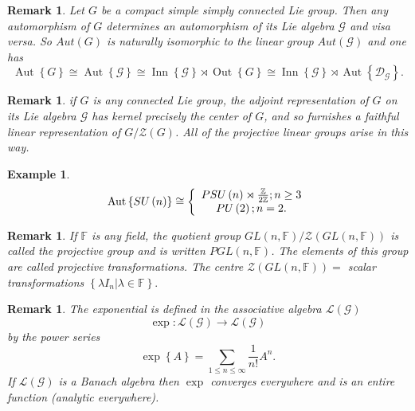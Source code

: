 \documentclass[aps,preprint]{revtex4}%
\newtheorem{example}[theorem]{Example}
\newtheorem{remark}[theorem]{Remark}
\begin{document}
\begin{remark}
Let $G$ be a \emph{compact simple simply connected Lie group}. Then any
automorphism of $G$ determines an automorphism of its Lie algebra
$\mathcal{G}$ and visa versa. So $Aut(G)$ is naturally isomorphic to the
linear group $Aut(\mathcal{G})$ and one has
\begin{equation}
\operatorname{Aut}\left\{  G\right\}  \cong\operatorname{Aut}\left\{
\mathcal{G}\right\}  \cong\operatorname*{Inn}\left\{  \mathcal{G}\right\}
\rtimes\operatorname*{Out}\left\{  G\right\}  \cong\operatorname*{Inn}\left\{
\mathcal{G}\right\}  \rtimes\operatorname{Aut}\left\{  \mathcal{D}%
_{\mathcal{G}}\right\}  .
\end{equation}

\end{remark}

\begin{remark}
if $G$ is any connected Lie group, the \emph{adjoint representation} of $G$ on
its Lie algebra $\mathcal{G}$ has kernel precisely the center of $G$, and so
furnishes a faithful linear representation of $G/\mathcal{Z}(G)$. \emph{All of
the projective linear groups} arise in this way.
\end{remark}

\begin{example}%
\begin{equation}
\operatorname{Aut}\left\{  SU\left(  n\right)  \right\}  \cong\left\{
\begin{array}
[c]{c}%
PSU\left(  n\right)  \rtimes\frac{\mathbb{Z}}{2\mathbb{Z}};n\geq3\\
PU\left(  2\right)  ;n=2.
\end{array}
\right.
\end{equation}

\end{example}

\begin{remark}
If $\mathbb{F}$ is any field, the quotient group $GL(n,\mathbb{F}%
)/\mathcal{Z}\left(  GL(n,\mathbb{F})\right)  $ is called the \emph{projective
group} and is written $PGL(n,\mathbb{F})$. The elements of this group are
called projective transformations. The centre $\mathcal{Z}\left(
GL(n,\mathbb{F})\right)  =$ scalar transformations $\left\{  \left.  \lambda
I_{n}\right\vert \lambda\in\mathbb{F}\right\}  .$
\end{remark}

\begin{remark}
The exponential is defined in the associative algebra $\mathcal{L}\left(
\mathcal{G}\right)  $
\begin{equation}
\exp:\mathcal{L}\left(  \mathcal{G}\right)  \rightarrow\mathcal{L}\left(
\mathcal{G}\right)
\end{equation}
by the power series
\begin{equation}
\exp\left\{  A\right\}  =\sum_{1\leq n\leq\infty}\frac{1}{n!}A^{n}.
\end{equation}
If $\mathcal{L}\left(  \mathcal{G}\right)  $ is a Banach algebra then $\exp$
converges everywhere and is an entire function (analytic everywhere).
\end{remark}
\end{document}
